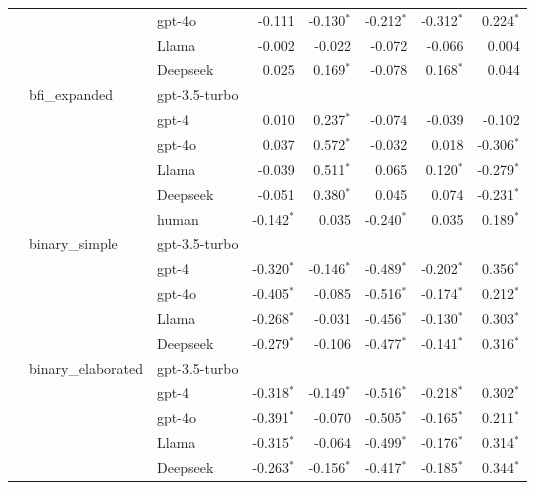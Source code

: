 \documentclass{article}
\begin{document}
\begin{longtable}{lllrrrrr}
      &                   & gpt-4o       & -0.111 & -0.130$^{*}$ & -0.212$^{*}$ & -0.312$^{*}$ & 0.224$^{*}$ \\
      &                   & Llama        & -0.002 & -0.022 & -0.072 & -0.066 & 0.004 \\
      &                   & Deepseek     & 0.025 & 0.169$^{*}$ & -0.078 & 0.168$^{*}$ & 0.044 \\
\addlinespace
& bfi\_expanded     & gpt-3.5-turbo &  &  &  &  &  \\
      &                   & gpt-4        & 0.010 & 0.237$^{*}$ & -0.074 & -0.039 & -0.102 \\
      &                   & gpt-4o       & 0.037 & 0.572$^{*}$ & -0.032 & 0.018 & -0.306$^{*}$ \\
      &                   & Llama        & -0.039 & 0.511$^{*}$ & 0.065 & 0.120$^{*}$ & -0.279$^{*}$ \\
      &                   & Deepseek     & -0.051 & 0.380$^{*}$ & 0.045 & 0.074 & -0.231$^{*}$ \\
\addlinespace
\midrule
\multirow{21}{*}{Risk} &  & human    & -0.142$^{*}$ & 0.035 & -0.240$^{*}$ & 0.035 & 0.189$^{*}$ \\
\addlinespace
& binary\_simple    & gpt-3.5-turbo &  &  &  &  &  \\
      &                   & gpt-4        & -0.320$^{*}$ & -0.146$^{*}$ & -0.489$^{*}$ & -0.202$^{*}$ & 0.356$^{*}$ \\
      &                   & gpt-4o       & -0.405$^{*}$ & -0.085 & -0.516$^{*}$ & -0.174$^{*}$ & 0.212$^{*}$ \\
      &                   & Llama        & -0.268$^{*}$ & -0.031 & -0.456$^{*}$ & -0.130$^{*}$ & 0.303$^{*}$ \\
      &                   & Deepseek     & -0.279$^{*}$ & -0.106 & -0.477$^{*}$ & -0.141$^{*}$ & 0.316$^{*}$ \\
\addlinespace
& binary\_elaborated & gpt-3.5-turbo &  &  &  &  &  \\
      &                   & gpt-4        & -0.318$^{*}$ & -0.149$^{*}$ & -0.516$^{*}$ & -0.218$^{*}$ & 0.302$^{*}$ \\
      &                   & gpt-4o       & -0.391$^{*}$ & -0.070 & -0.505$^{*}$ & -0.165$^{*}$ & 0.211$^{*}$ \\
      &                   & Llama        & -0.315$^{*}$ & -0.064 & -0.499$^{*}$ & -0.176$^{*}$ & 0.314$^{*}$ \\
      &                   & Deepseek     & -0.263$^{*}$ & -0.156$^{*}$ & -0.417$^{*}$ & -0.185$^{*}$ & 0.344$^{*}$ \\

\end{longtable}
\end{document}
